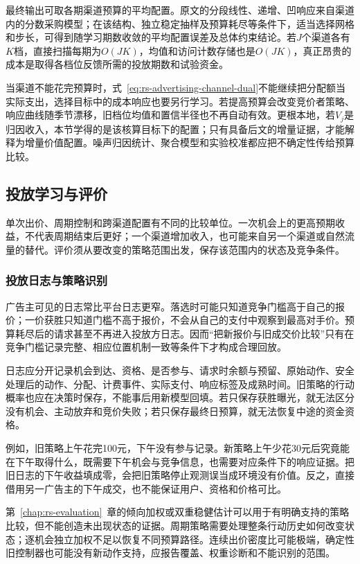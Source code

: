 最终输出可取各期渠道预算的平均配置。原文的分段线性、递增、凹响应来自渠道内的分数采购模型；在该结构、独立稳定抽样及预算耗尽等条件下，适当选择网格和步长，可得到随学习期数收敛的平均配置误差及总体约束结论。若$J$个渠道各有$K$档，直接扫描每期为$O(JK)$，均值和访问计数存储也是$O(JK)$，真正昂贵的成本是取得各档位反馈所需的投放期数和试验资金。

当渠道不能花完预算时，式~\eqref{eq:rs-advertising-channel-dual}不能继续把分配额当实际支出，选择目标中的成本响应也要另行学习。若提高预算会改变竞价者策略、响应曲线随季节漂移，旧档位均值和置信半径也不再自动有效。更根本地，若$V_j$是归因收入，本节学得的是该核算目标下的配置；只有具备后文的增量证据，才能解释为增量价值配置。噪声归因统计、聚合模型和实验校准都应把不确定性传给预算比较。

\subsection{投放学习与评价}
\label{sec:rs-advertising-policy-evaluation}

单次出价、周期控制和跨渠道配置有不同的比较单位。一次机会上的更高预期收益，不代表周期结束后更好；一个渠道增加收入，也可能来自另一个渠道或自然流量的替代。评价须从要改变的策略范围出发，保存该范围内的状态及竞争条件。

\subsubsection{投放日志与策略识别}
\label{sec:rs-advertising-policy-logs}

广告主可见的日志常比平台日志更窄。落选时可能只知道竞争门槛高于自己的报价；一价获胜只知道门槛不高于报价，不会从自己的支付中观察到最高对手价。预算耗尽后的请求甚至不再进入投放方日志。因而“把新报价与旧成交价比较”只有在竞争门槛记录完整、相应位置机制一致等条件下才构成合理回放。

日志应分开记录机会到达、资格、是否参与、请求时余额与预留、原始动作、安全处理后的动作、分配、计费事件、实际支付、响应标签及成熟时间。旧策略的行动概率也应在决策时保存，不能事后用新模型回填。若只保存获胜曝光，就无法区分没有机会、主动放弃和竞价失败；若只保存最终日预算，就无法恢复中途的资金资格。

例如，旧策略上午花完100元，下午没有参与记录。新策略上午少花30元后究竟能在下午取得什么，既需要下午机会与竞争信息，也需要对应条件下的响应证据。把旧日志的下午收益填成零，会把旧策略停止观测误当成环境没有价值。反之，直接借用另一广告主的下午成交，也不能保证用户、资格和价格可比。

第~\ref{chap:rs-evaluation}~章的倾向加权或双重稳健估计可以用于有明确支持的策略比较，但不能创造未出现状态的证据。周期策略需要处理整条行动历史如何改变状态；逐机会独立加权不足以恢复不同预算路径。连续出价密度比可能极端，确定性旧控制器也可能没有新动作支持，应报告覆盖、权重诊断和不能识别的范围。

